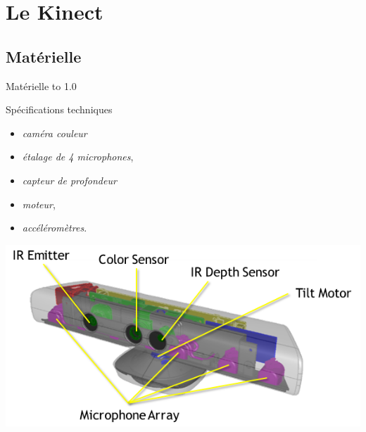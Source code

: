 \section{Le Kinect}

\begin{frame}
\end{frame}

\subsection{Matérielle}
\begin{frame}{Matérielle}
\vbox to 1.0\textheight
{
\begin{block}{Spécifications techniques}
  \begin{minipage}[t]{0.49\linewidth}
    \begin{itemize}
    \item<1-> \emph{caméra couleur}
    \item<2-> \emph{étalage de 4 microphones},
    \end{itemize}
  \end{minipage} 
  \begin{minipage}[t]{0.49\linewidth}
    \begin{itemize}
    \item<3-> \emph{capteur de profondeur}
    \item<4-> \emph{moteur},
    \item<4-> \emph{accéléromètres}.
    \end{itemize}
  \end{minipage}
\end{block}
  \begin{center}
    \includegraphics[height=0.4\textheight]{../images/kinect_specs}
  \end{center}
  \vfill
}
\end{frame}

